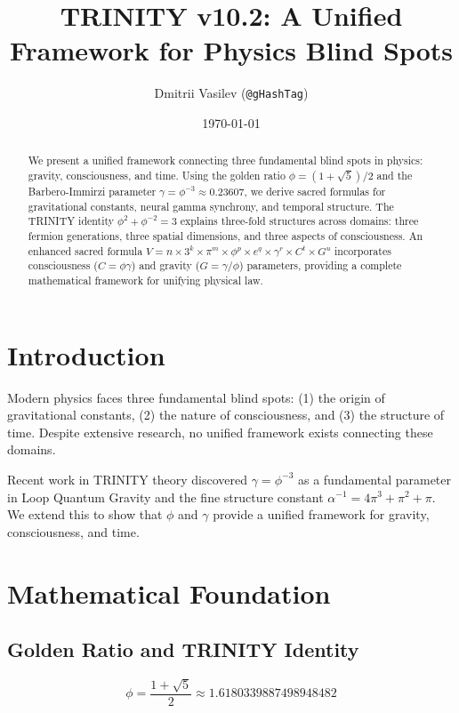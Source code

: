 \documentclass[12pt,a4paper]{article}
\title{TRINITY v10.2: A Unified Framework for Physics Blind Spots}
\author{Dmitrii Vasilev (\texttt{@gHashTag})}
\date{\today}
\begin{document}
\maketitle

\begin{abstract}
We present a unified framework connecting three fundamental blind spots in physics: gravity, consciousness, and time. Using the golden ratio $\phi = (1+\sqrt{5})/2$ and the Barbero-Immirzi parameter $\gamma = \phi^{-3} \approx 0.23607$, we derive sacred formulas for gravitational constants, neural gamma synchrony, and temporal structure. The TRINITY identity $\phi^2 + \phi^{-2} = 3$ explains three-fold structures across domains: three fermion generations, three spatial dimensions, and three aspects of consciousness. An enhanced sacred formula $V = n \times 3^k \times \pi^m \times \phi^p \times e^q \times \gamma^r \times C^t \times G^u$ incorporates consciousness ($C = \phi\gamma$) and gravity ($G = \gamma/\phi$) parameters, providing a complete mathematical framework for unifying physical law.
\end{abstract}

\section{Introduction}

Modern physics faces three fundamental blind spots: (1) the origin of gravitational constants, (2) the nature of consciousness, and (3) the structure of time. Despite extensive research, no unified framework exists connecting these domains.

Recent work in TRINITY theory discovered $\gamma = \phi^{-3}$ as a fundamental parameter in Loop Quantum Gravity and the fine structure constant $\alpha^{-1} = 4\pi^3 + \pi^2 + \pi$. We extend this to show that $\phi$ and $\gamma$ provide a unified framework for gravity, consciousness, and time.

\section{Mathematical Foundation}

\subsection{Golden Ratio and TRINITY Identity}

\begin{equation}
\phi = \frac{1 + \sqrt{5}}{2} \approx 1.6180339887498948482
\end{equation}
\end{document}
